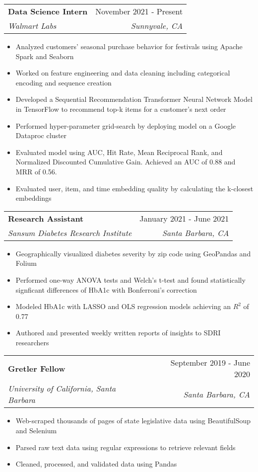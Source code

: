 \documentclass[letterpaper,11pt]{article}
\makeatletter
\newcommand{\resumeItem}[1]{
  \item\small{
    {#1 \vspace{-2pt}}
  }
}
\newcommand{\resumeSubheading}[4]{
  \vspace{-2pt}\item
    \begin{tabular*}{0.97\textwidth}[t]{l@{\extracolsep{\fill}}r}
      \textbf{#1} & #2 \\
      \textit{\small#3} & \textit{\small #4} \\
    \end{tabular*}\vspace{-7pt}
}
\newcommand{\resumeSubSubheading}[2]{
    \item
    \begin{tabular*}{0.97\textwidth}{l@{\extracolsep{\fill}}r}
      \textit{\small#1} & \textit{\small #2} \\
    \end{tabular*}\vspace{-7pt}
}
\newcommand{\resumeSubHeadingListEnd}{\end{itemize}}
\newcommand{\resumeItemListStart}{\begin{itemize}}
\newcommand{\resumeItemListEnd}{\end{itemize}\vspace{-5pt}}
\makeatother
\begin{document}
    \resumeSubheading
      {Data Science Intern}{November 2021 - Present}
      {Walmart Labs}{Sunnyvale, CA}
      \resumeItemListStart
        \resumeItem{Analyzed customers' seasonal purchase behavior for festivals using Apache Spark and Seaborn}
        \resumeItem{Worked on feature engineering and data cleaning including categorical encoding and sequence creation}
        \resumeItem{Developed a Sequential Recommendation Transformer Neural Network Model in TensorFlow to recommend top-k items for a customer's next order}
        \resumeItem{Performed hyper-parameter grid-search by deploying model on a Google Dataproc cluster}  
        \resumeItem{Evaluated model using AUC, Hit Rate, Mean Reciprocal Rank, and Normalized Discounted Cumulative Gain. Achieved an AUC of 0.88 and MRR of 0.56.} 
        \resumeItem{Evaluated user, item, and time embedding quality by calculating the k-closest embeddings}
      \resumeItemListEnd
      

    \resumeSubheading
      {Research Assistant}{January 2021 - June 2021}
      {Sansum Diabetes Research Institute}{Santa Barbara, CA}
      \resumeItemListStart
        \resumeItem{Geographically visualized diabetes severity by zip code using GeoPandas and Folium}
        
        \resumeItem{Performed one-way ANOVA tests and Welch's t-test and found statistically signficant differences of HbA1c with Bonferroni's correction}
        
        \resumeItem{Modeled HbA1c with LASSO and OLS regression models achieving an $R^{2}$ of 0.77}
        
        \resumeItem{Authored and presented weekly written reports of insights to SDRI researchers}
    \resumeItemListEnd

    \resumeSubheading
      {Gretler Fellow}{September 2019 - June 2020}
      {University of California, Santa Barbara}{Santa Barbara, CA}
      \resumeItemListStart
        \resumeItem{Web-scraped thousands of pages of state legislative data using BeautifulSoup and Selenium}
        \resumeItem{Parsed raw text data using regular expressions to retrieve relevant fields}
        \resumeItem{Cleaned, processed, and validated data using Pandas}
      \resumeItemListEnd
\end{document}
